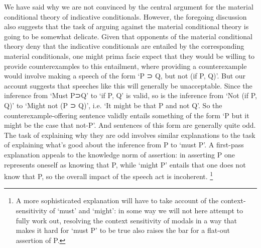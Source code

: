 \documentclass[If.tex]{subfiles}
\begin{document}
We have said why we are not convinced by the central argument for the material conditional theory of indicative conditionals.  However, the foregoing discussion also suggests that the task of arguing against the material conditional theory is going to be somewhat delicate.  Given that opponents of the material conditional theory deny that the indicative conditionals are entailed by the corresponding material conditionals, one might prima facie expect that they would be willing to provide counterexamples to this entailment, where providing a counterexample would involve making a speech of the form ‘P ⊃ Q, but not (if P, Q)’.  But our account suggests that speeches like this will generally be unacceptable.  Since the inference from ‘Must P⊃Q’ to ‘if P, Q’ is valid, so is the inference from ‘Not (if P, Q)’ to ‘Might not (P ⊃ Q)’, i.e. ‘It might be that P and not Q’.  So the counterexample-offering sentence validly entails something of the form ‘P but it might be the case that not-P’.  And sentences of this form are generally quite odd.  The task of explaining why they are odd involves similar explanations to the task of explaining what's good about the inference from P to ‘must P’.  A first-pass explanation appeals to the knowledge norm of assertion: in asserting P one represents oneself as knowing that P, while ‘might P’ entails that one does not know that P, so the overall impact of the speech act is incoherent.%
\footnote{A more sophisticated explanation will have to take account of the context-sensitivity of ‘must’ and ‘might’: in some way we will not here attempt to fully work out, resolving the context sensitivity of modals in a way that makes it hard for ‘must P’ to be true also raises the bar for a flat-out assertion of P.}
\end{document}
